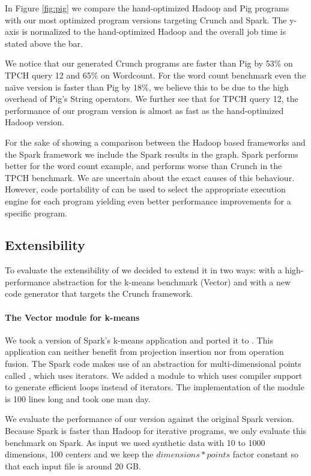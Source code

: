 In Figure \ref{fig:pig} we compare the hand-optimized Hadoop and Pig programs
with our most optimized program versions targeting Crunch and Spark.
The y-axis is normalized to the hand-optimized Hadoop and the overall
job time is stated above the bar. 

We notice that our generated Crunch programs are faster than Pig by 53\% on
TPCH query 12 and 65\% on Wordcount. For the word count benchmark even the na\"{\i}ve
version is faster than Pig by 18\%, we believe this to be due to the high
overhead of Pig's String operators. We further see that for TPCH query 12, the
performance of our program version is almost as fast as the hand-optimized
Hadoop version.

For the sake of showing a comparison between the Hadoop based frameworks
and the Spark framework we include the Spark results in the graph. Spark
performs better for the word count example, and performs worse than Crunch in
the TPCH benchmark. We are uncertain about the exact causes of this behaviour.
However, code portability of \tool can be used to select the appropriate
execution engine for each program yielding even better performance improvements
for a specific program. 

\subsection{Extensibility}
\label{subsec:kmeans}

To evaluate the extensibility of \tool we decided to extend it in two ways: 
with a high-performance abstraction for the k-means benchmark (Vector) and
with a new code generator that targets the Crunch framework.
 
\paragraph{The Vector module for k-means} 
We took a version of Spark's k-means \cite{spark-nsdi} application and
ported it to \tool. This application can neither benefit from projection
insertion nor from operation fusion. The Spark code makes use of an abstraction
for multi-dimensional points called , which uses iterators. We added
a  module to \tool which uses compiler support to generate
efficient loops instead of iterators. The implementation of the  module is 100
lines long and took one man day.

We evaluate the performance of our version against the original Spark version.
Because Spark is faster than Hadoop for iterative programs, we only evaluate
this benchmark on Spark.
As input we used synthetic data with 10 to 1000 dimensions, 100 centers and we
keep the $dimensions * points$ factor constant so that each input file is around 20 GB.

